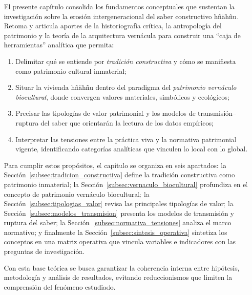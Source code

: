 El presente capítulo consolida los fundamentos conceptuales que
sustentan la investigación sobre la erosión intergeneracional del saber
constructivo hñähñu.  Retoma y articula aportes de la historiografía
crítica, la antropología del patrimonio y la teoría de la arquitectura
vernácula para construir una ``caja de herramientas'' analítica que
permita:

\begin{enumerate}
  \item Delimitar qué se entiende por \emph{tradición constructiva} y
        cómo se manifiesta como patrimonio cultural inmaterial;
  \item Situar la vivienda hñähñu dentro del paradigma del \emph{patrimonio
        vernáculo biocultural}, donde convergen valores materiales,
        simbólicos y ecológicos;
  \item Precisar las tipologías de valor patrimonial y los modelos de
        transmisión–ruptura del saber que orientarán la lectura de los
        datos empíricos;
  \item Interpretar las tensiones entre la práctica viva y la normativa
        patrimonial vigente, identificando categorías analíticas que
        vinculen lo local con lo global.
\end{enumerate}

Para cumplir estos propósitos, el capítulo se organiza en seis
apartados: la Sección~\ref{subsec:tradicion_constructiva} define la
tradición constructiva como patrimonio inmaterial; la
Sección~\ref{subsec:vernaculo_biocultural} profundiza en el concepto de
patrimonio vernáculo biocultural; la
Sección~\ref{subsec:tipologias_valor} revisa las principales tipologías
de valor; la Sección~\ref{subsec:modelos_transmision} presenta los
modelos de transmisión y ruptura del saber; la
Sección~\ref{subsec:normativa_tensiones} analiza el marco normativo; y
finalmente la Sección~\ref{subsec:sintesis_operativa} sintetiza los
conceptos en una matriz operativa que vincula variables e indicadores
con las preguntas de investigación.

Con esta base teórica se busca garantizar la coherencia interna entre
hipótesis, metodología y análisis de resultados, evitando reduccionismos
que limiten la comprensión del fenómeno estudiado.

